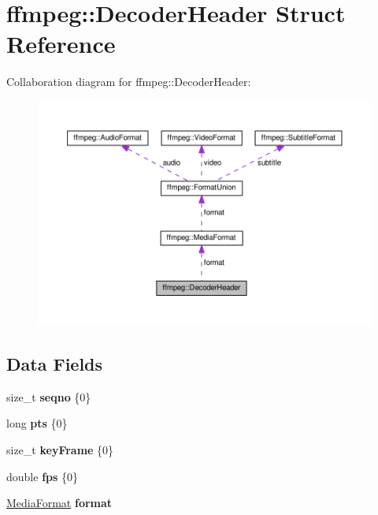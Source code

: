 \hypertarget{structffmpeg_1_1DecoderHeader}{}\section{ffmpeg\+:\+:Decoder\+Header Struct Reference}
\label{structffmpeg_1_1DecoderHeader}


Collaboration diagram for ffmpeg\+:\+:Decoder\+Header\+:
\nopagebreak
\begin{figure}[H]
\begin{center}
\leavevmode
\includegraphics[width=350pt]{structffmpeg_1_1DecoderHeader__coll__graph}
\end{center}
\end{figure}
\subsection*{Data Fields}
\begin{DoxyCompactItemize}
\item 
\mbox{\label{structffmpeg_1_1DecoderHeader_aacee7ddf518368a94d749cbb0fccb68f}} 
size\+\_\+t {\bfseries seqno} \{0\}
\item 
\mbox{\label{structffmpeg_1_1DecoderHeader_a0db77cc2afcb0b4af3e3cc0f675b565a}} 
long {\bfseries pts} \{0\}
\item 
\mbox{\label{structffmpeg_1_1DecoderHeader_a66d39e8412eb82f588b1e4d43dbbb0e1}} 
size\+\_\+t {\bfseries key\+Frame} \{0\}
\item 
\mbox{\label{structffmpeg_1_1DecoderHeader_a6348501df8daf0ce706213140714f714}} 
double {\bfseries fps} \{0\}
\item 
\mbox{\label{structffmpeg_1_1DecoderHeader_abf4ad6ff46c06549dbfcdda22a68cd31}} 
\hyperlink{structffmpeg_1_1MediaFormat}{Media\+Format} {\bfseries format}
\end{DoxyCompactItemize}


